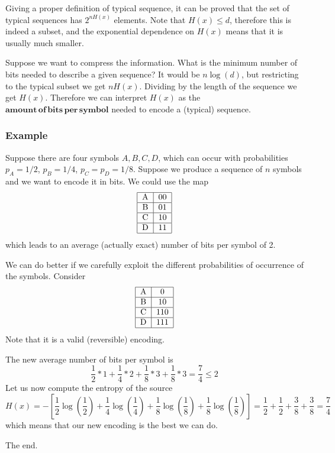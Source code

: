 \documentclass[a4paper, 11pt]{article}
\begin{document}
	Giving a proper definition of typical sequence, it can be proved that the set of typical sequences has $2^{nH(x)}$ elements. Note that $H(x) \le d$, therefore this is indeed a subset, and the exponential dependence on $H(x)$ means that it is usually much smaller.
	
	Suppose we want to compress the information. What is the minimum number of bits needed to describe a given sequence? It would be $n\log(d)$, but restricting to the typical subset we get $nH(x)$. Dividing by the length of the sequence we get $H(x)$. Therefore we can interpret $H(x)$ as the $\mathbf{amount\, of\, bits\, per\, symbol}$ needed to encode a (typical) sequence.
	
	\subsubsection{Example}
	Suppose there are four symbols $A,B,C,D$, which can occur with probabilities $p_A=1/2$, $p_B=1/4$, $p_C=p_D = 1/8$. Suppose we produce a sequence of $n$ symbols and we want to encode it in bits. We could use the map
	\begin{align*}
	\begin{tabular}{|c|c|}
		\hline 
		A & 00 \\ 
		\hline 
		B & 01 \\ 
		\hline 
		C & 10 \\ 
		\hline 
		D & 11 \\ 
		\hline 
	\end{tabular} 
	\end{align*}
	which leads to an average (actually exact) number of bits per symbol of 2.
	
	We can do better if we carefully exploit the different probabilities of occurrence of the symbols. Consider
	\begin{align*}
	\begin{tabular}{|c|c|}
	\hline 
	A & 0 \\ 
	\hline 
	B & 10 \\ 
	\hline 
	C & 110 \\ 
	\hline 
	D & 111 \\ 
	\hline 
	\end{tabular} 
	\end{align*}
	Note that it is a valid (reversible) encoding.
	
	The new average number of bits per symbol is
	\[ \frac{1}{2}*1 + \frac{1}{4} * 2 + \frac{1}{8} * 3 + \frac{1}{8} * 3 = \frac{7}{4} \le 2 \]
	Let us now compute the entropy of the source
	\[ H(x) = -\left[ \frac{1}{2} \log\left(\frac{1}{2}\right) + \frac{1}{4} \log\left(\frac{1}{4}\right) + \frac{1}{8} \log\left(\frac{1}{8}\right) + \frac{1}{8} \log\left(\frac{1}{8}\right) \right] = \frac{1}{2} + \frac{1}{2} + \frac{3}{8} + \frac{3}{8} = \frac{7}{4} \]
	which means that our new encoding is the best we can do.
	
	
	\newpage
	The end.
\end{document}
